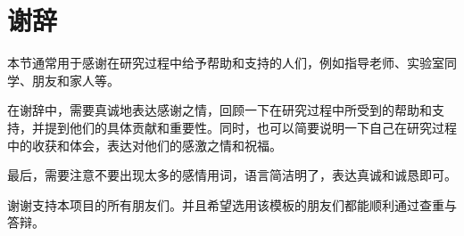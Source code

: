 \section*{谢辞}

本节通常用于感谢在研究过程中给予帮助和支持的人们，例如指导老师、实验室同学、朋友和家人等。

在谢辞中，需要真诚地表达感谢之情，回顾一下在研究过程中所受到的帮助和支持，并提到他们的具体贡献和重要性。同时，也可以简要说明一下自己在研究过程中的收获和体会，表达对他们的感激之情和祝福。

最后，需要注意不要出现太多的感情用词，语言简洁明了，表达真诚和诚恳即可。

谢谢支持本项目的所有朋友们。并且希望选用该模板的朋友们都能顺利通过查重与答辩。
